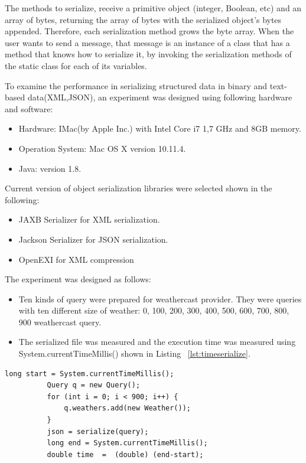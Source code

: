 The methods to serialize, receive a primitive object (integer, Boolean, etc) and an array of bytes, returning the array of bytes with the serialized object’s bytes appended. Therefore, each serialization method grows the byte array. When the user wants to send a message, that message is an instance of a class that has a method that knows how to serialize it, by invoking the serialization methods of the static class for each of its variables.

To examine the performance in serializing structured  data in binary and text-based data(XML,JSON), an experiment was designed using following hardware and software:
\begin{itemize}
\item 	Hardware: IMac(by Apple Inc.) with Intel Core i7 1,7 GHz and 8GB memory.
\item 	Operation System: Mac OS X version 10.11.4.
\item 	Java: version 1.8.
\end{itemize}
Current version of object serialization libraries were selected shown in the following:
\begin{itemize}
\item JAXB Serializer for XML serialization.
\item Jackson Serializer for JSON serialization.
\item OpenEXI for XML compression
\end{itemize}
The experiment was designed as follows:
\begin{itemize}
\item Ten kinds of query were prepared for weathercast provider. They were queries with ten different size of weather: 0, 100, 200, 300, 400, 500, 600, 700, 800, 900 weathercast query.
\item The serialized file was measured and the execution time was measured using System.currentTimeMillis() shown in Listing ~\ref{lst:timeserialize}.
\end{itemize}

\begin{lstlisting}[caption=Serialization program for testing, label=lst:timeserialize]
          long start = System.currentTimeMillis();
          Query q = new Query();
          for (int i = 0; i < 900; i++) {
              q.weathers.add(new Weather());
          }
          json = serialize(query);
          long end = System.currentTimeMillis();
          double time  =  (double) (end-start);
\end{lstlisting}

